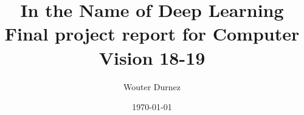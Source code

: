 \documentclass[11pt, a4paper]{article}
\begin{document}


\title{
	\LARGE \textbf{In the Name of Deep Learning} \\
	\vspace{5mm}
	\large Final project report for Computer Vision 18-19
}

\author{Wouter Durnez}
\date{\today}

\maketitle
\tableofcontents
{}
\newpage
{}






\clearpage




\clearpage





\clearpage




\clearpage

\end{document}
